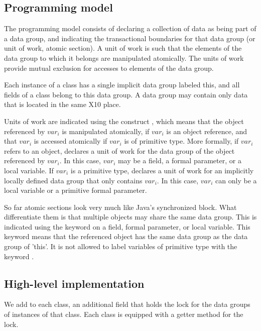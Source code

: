 \documentclass{article}
\begin{document}
\subsection{Programming model}

The programming model consists of declaring a collection of data as being part of a data group, and indicating the transactional boundaries for that data group (or unit of work, atomic section). A unit of work is such that the elements of the data group to which it belongs are manipulated atomically. The units of work provide mutual exclusion for accesses to elements of the data group.

Each instance of a class has a single implicit data group labeled this, and all fields of a class belong to this data group. A data group may contain only data that is located in the same X10 place.

Units of work are indicated using the construct , which means that the object referenced by $var_i$ is manipulated atomically, if $var_i$ is an object reference, and that  $var_i$ is accessed atomically if  $var_i$ is of primitive type. More formally, if  $var_i$ refers to an object,  declares a unit of work for the data group of the object referenced by  $var_i$. In this case,  $var_i$ may be a field, a formal parameter, or a local variable.
If  $var_i$ is a primitive type,   declares a unit of work for an implicitly locally defined data group that only contains $var_i$. In this case, $var_i$ can only be a local variable or a primitive formal parameter.

So far atomic sections look very much like Java's synchronized block. What differentiate them is that multiple objects may share the same data group. This is indicated using the  keyword on a field, formal parameter, or local variable. This keyword means that the referenced object has the same data group as the data group of 'this'. It is not allowed to label variables of primitive type with the keyword .

\subsection{High-level implementation}


We add to each class, an additional field that holds the lock for the data groups of instances of that class.
 Each class is equipped with a getter method for the lock.
\end{document}
